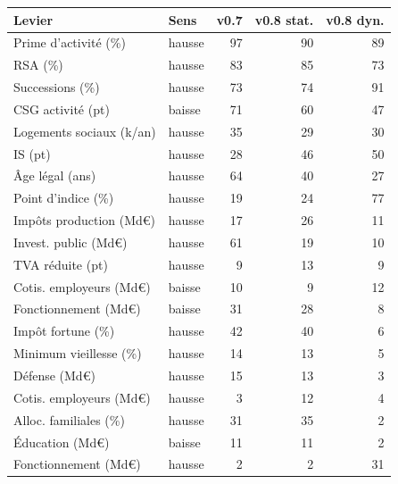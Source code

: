 \begin{tabular}{llrrr}\toprule
Levier & Sens & v0.7 & v0.8 stat. & v0.8 dyn. \\ \midrule
Prime d'activité (\%) & hausse & 97 & 90 & 89 \\
RSA (\%) & hausse & 83 & 85 & 73 \\
Successions (\%) & hausse & 73 & 74 & 91 \\
CSG activité (pt) & baisse & 71 & 60 & 47 \\
Logements sociaux (k/an) & hausse & 35 & 29 & 30 \\
IS (pt) & hausse & 28 & 46 & 50 \\
Âge légal (ans) & hausse & 64 & 40 & 27 \\
Point d'indice (\%) & hausse & 19 & 24 & 77 \\
Impôts production (Md€) & hausse & 17 & 26 & 11 \\
Invest. public (Md€) & hausse & 61 & 19 & 10 \\
TVA réduite (pt) & hausse & 9 & 13 & 9 \\
Cotis. employeurs (Md€) & baisse & 10 & 9 & 12 \\
Fonctionnement (Md€) & baisse & 31 & 28 & 8 \\
Impôt fortune (\%) & hausse & 42 & 40 & 6 \\
Minimum vieillesse (\%) & hausse & 14 & 13 & 5 \\
Défense (Md€) & hausse & 15 & 13 & 3 \\
Cotis. employeurs (Md€) & hausse & 3 & 12 & 4 \\
Alloc. familiales (\%) & hausse & 31 & 35 & 2 \\
Éducation (Md€) & baisse & 11 & 11 & 2 \\
Fonctionnement (Md€) & hausse & 2 & 2 & 31 \\
\bottomrule\end{tabular}
